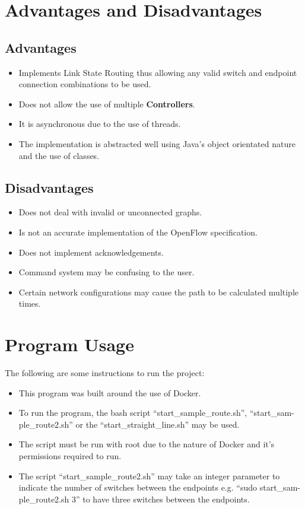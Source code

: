 \documentclass{article}
\begin{document}
\section{Advantages and Disadvantages}
\subsection{Advantages}
\begin{itemize}
  \item{Implements Link State Routing thus allowing any valid switch and
    endpoint connection combinations to be used.}
  \item{Does not allow the use of multiple \textbf{Controllers}.}
  \item{It is asynchronous due to the use of threads.}
  \item{The implementation is abstracted well using Java's object orientated
    nature and the use of classes.}
\end{itemize}
\subsection{Disadvantages}
\begin{itemize}
  \item{Does not deal with invalid or unconnected graphs.}
  \item{Is not an accurate implementation of the OpenFlow specification.}
  \item{Does not implement acknowledgements.}
  \item{Command system may be confusing to the user.}
  \item{Certain network configurations may cause the path to be calculated
    multiple times.}
\end{itemize}

\section{Program Usage}
The following are some instructions to run the project:
\begin{itemize}
  \item{This program was built around the use of Docker.}
  \item{To run the program, the bash script ``start\_sample\_route.sh'',
    ``start\_sam-\\ple\_route2.sh'' or the ``start\_straight\_line.sh'' may be
  used.}
  \item{The script must be run with root due to the nature of Docker and it's
    permissions required to run.}
  \item{The script ``start\_sample\_route2.sh'' may take an integer parameter
    to indicate the number of switches between the endpoints e.g. ``sudo
  start\_sam-\\ple\_route2.sh 3'' to have three switches between the endpoints.}
\end{itemize}
\end{document}
